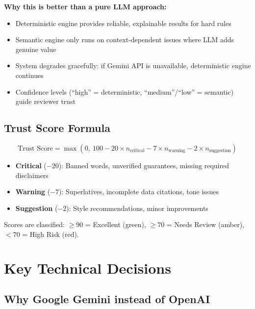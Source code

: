 \documentclass[11pt,a4paper]{article}
\begin{document}
\vspace{0.5cm}

\textbf{Why this is better than a pure LLM approach:}
\begin{itemize}
    \item Deterministic engine provides reliable, explainable results for hard rules
    \item Semantic engine only runs on context-dependent issues where LLM adds genuine value
    \item System degrades gracefully: if Gemini API is unavailable, deterministic engine continues
    \item Confidence levels (``high'' = deterministic, ``medium''/``low'' = semantic) guide reviewer trust
\end{itemize}

\subsection{Trust Score Formula}

\[
\text{Trust Score} = \max\left(0,\ 100 - 20 \times n_\text{critical} - 7 \times n_\text{warning} - 2 \times n_\text{suggestion}\right)
\]

\begin{itemize}
    \item \textbf{Critical} ($-20$): Banned words, unverified guarantees, missing required disclaimers
    \item \textbf{Warning} ($-7$): Superlatives, incomplete data citations, tone issues
    \item \textbf{Suggestion} ($-2$): Style recommendations, minor improvements
\end{itemize}

Scores are classified: $\geq 90$ = Excellent (green), $\geq 70$ = Needs Review (amber), $< 70$ = High Risk (red).

\section{Key Technical Decisions}

\subsection{Why Google Gemini instead of OpenAI}
\end{document}
